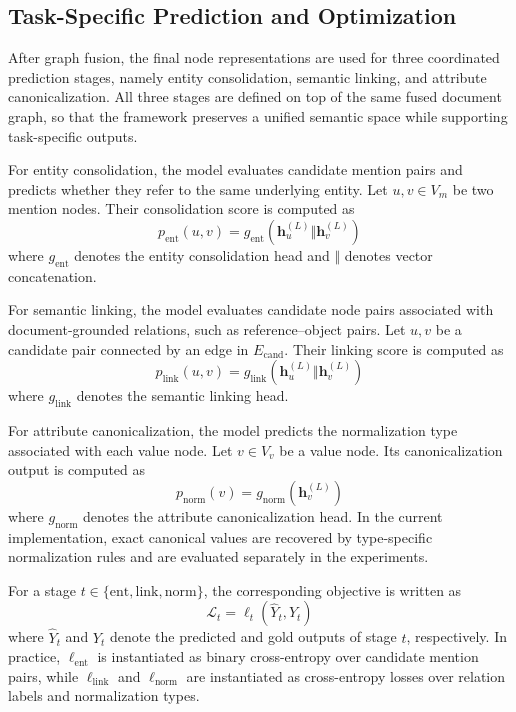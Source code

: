 \documentclass[pdflatex,twocolumn,iicol,sn-vancouver-num]{sn-jnl}%
\theoremstyle{thmstyleone}%
\theoremstyle{thmstyletwo}%
\theoremstyle{thmstylethree}%
\begin{document}
\subsection{Task-Specific Prediction and Optimization}

After graph fusion, the final node representations are used for three coordinated prediction stages, namely entity consolidation, semantic linking, and attribute canonicalization. All three stages are defined on top of the same fused document graph, so that the framework preserves a unified semantic space while supporting task-specific outputs.

For entity consolidation, the model evaluates candidate mention pairs and predicts whether they refer to the same underlying entity. Let \(u, v \in V_m\) be two mention nodes. Their consolidation score is computed as
\begin{equation}
p_{\mathrm{ent}}(u, v) = g_{\mathrm{ent}}(\mathbf{h}^{(L)}_u \Vert \mathbf{h}^{(L)}_v)
\end{equation}
where \(g_{\mathrm{ent}}\) denotes the entity consolidation head and \(\Vert\) denotes vector concatenation.

For semantic linking, the model evaluates candidate node pairs associated with document-grounded relations, such as reference--object pairs. Let \(u, v\) be a candidate pair connected by an edge in \(E_{\mathrm{cand}}\). Their linking score is computed as
\begin{equation}
p_{\mathrm{link}}(u, v) = g_{\mathrm{link}}(\mathbf{h}^{(L)}_u \Vert \mathbf{h}^{(L)}_v)
\end{equation}
where \(g_{\mathrm{link}}\) denotes the semantic linking head.

For attribute canonicalization, the model predicts the normalization type associated with each value node. Let \(v \in V_v\) be a value node. Its canonicalization output is computed as
\begin{equation}
p_{\mathrm{norm}}(v) = g_{\mathrm{norm}}(\mathbf{h}^{(L)}_v)
\end{equation}
where \(g_{\mathrm{norm}}\) denotes the attribute canonicalization head. In the current implementation, exact canonical values are recovered by type-specific normalization rules and are evaluated separately in the experiments.

For a stage \(t \in \{\mathrm{ent}, \mathrm{link}, \mathrm{norm}\}\), the corresponding objective is written as
\begin{equation}
\mathcal{L}_t = \ell_t(\hat{Y}_t, Y_t)
\end{equation}
where \(\hat{Y}_t\) and \(Y_t\) denote the predicted and gold outputs of stage \(t\), respectively. In practice, \(\ell_{\mathrm{ent}}\) is instantiated as binary cross-entropy over candidate mention pairs, while \(\ell_{\mathrm{link}}\) and \(\ell_{\mathrm{norm}}\) are instantiated as cross-entropy losses over relation labels and normalization types.
\end{document}
